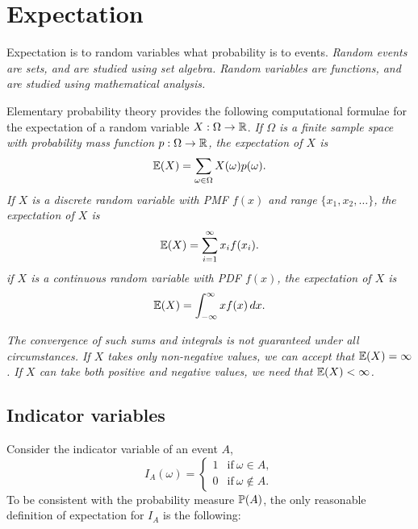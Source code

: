 \chapter{Expectation}\label{chap:expectationI}
Expectation is to random variables what probability is to events.
\bit
\it Random events are \emph{sets}, and are studied using \emph{set algebra}. 
\it Random variables are \emph{functions}, and are studied using \emph{mathematical analysis}.
\eit

\bigskip
Elementary probability theory provides the following computational formulae for the expectation of a random variable $X:\Omega\to\mathbb{R}$.
\ben
\it If $\Omega$ is a finite sample space with probability mass function $p:\Omega\to\mathbb{R}$, the expectation of $X$ is
\[
\mathbb{E}(X) = \sum_{\omega\in\Omega} X(\omega) p(\omega).
\]
\it If $X$ is a discrete random variable with PMF $f(x)$ and range $\{x_1,x_2,\ldots\}$, the expectation of $X$ is
\[
\mathbb{E}(X) = \sum_{i=1}^{\infty} x_i f(x_i).
\]
\it if $X$ is a continuous random variable with PDF $f(x)$, the expectation of $X$ is
\[
\mathbb{E}(X) = \int_{-\infty}^{\infty} x f(x)\,dx.
\]
\een

\bit
\it The convergence of such sums and integrals is not guaranteed under all circumstances.
\it If $X$ takes only non-negative values, we can accept that $\mathbb{E}(X)=\infty$.
\it If $X$ can take both positive and negative values, we need that $\mathbb{E}(X)<\infty$.
\eit

\section{Indicator variables}\label{sec:expe_indicator}
Consider the indicator variable of an event $A$,
\[
I_{A}(\omega) = \begin{cases} 
	1 & \text{if}\ \omega\in A, \\
	0 & \text{if}\ \omega\notin A.
\end{cases}	
\]
To be consistent with the probability measure $\mathbb{P}(A)$, the only reasonable definition of expectation for $I_A$ is the following:

